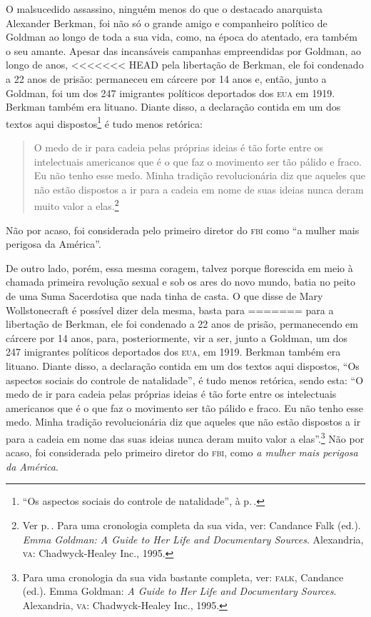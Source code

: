 O malsucedido assassino,
ninguém menos do que o destacado anarquista Alexander Berkman, foi não
só o grande amigo e companheiro político de Goldman ao longo de toda a
sua vida, como, na época do atentado, era também o seu amante. Apesar
das incansáveis campanhas empreendidas por Goldman, ao longo de anos,
<<<<<<< HEAD
pela libertação de Berkman, ele foi condenado a 22 anos de
prisão: permaneceu em cárcere por 14 anos e, então,
junto a Goldman, foi um dos 247 imigrantes políticos deportados
dos \textsc{eua} em 1919. Berkman também era lituano. Diante disso, a declaração
contida em um dos textos aqui dispostos\footnote{``Os aspectos sociais do
controle de natalidade'', à p.\,\pageref{ref4}.} é tudo menos retórica:

\begin{quote}
O medo de ir para
cadeia pelas próprias ideias é tão forte entre os intelectuais
americanos que é o que faz o movimento ser tão pálido e fraco. Eu não
tenho esse medo. Minha tradição revolucionária diz que aqueles que não
estão dispostos a ir para a cadeia em nome de suas ideias nunca deram
muito valor a elas.\footnote{Ver p.\,\pageref{ref5}. Para uma cronologia completa da sua vida, ver: Candance Falk (ed.). \emph{Emma Goldman: A Guide to
  Her Life and Documentary Sources}. Alexandria, \textsc{va}: Chadwyck-Healey
  Inc., 1995.}
\end{quote}

  Não por acaso, foi considerada pelo primeiro diretor do
\textsc{fbi} como ``a mulher mais perigosa da América''.

De outro lado, porém, essa mesma coragem, talvez porque florescida em
meio à chamada primeira revolução sexual e sob os ares do novo mundo,
batia no peito de uma Suma Sacerdotisa que nada tinha de casta. O que
disse de Mary Wollstonecraft é possível dizer dela mesma, basta para
=======
para a libertação de Berkman, ele foi condenado a 22 anos de
prisão, permanecendo em cárcere por 14 anos, para, posteriormente,
vir a ser, junto a Goldman, um dos 247 imigrantes políticos deportados
dos \textsc{eua}, em 1919. Berkman também era lituano. Diante disso, a declaração
contida em um dos textos aqui dispostos, ``Os aspectos sociais do
controle de natalidade'', é tudo menos retórica, sendo esta: ``O medo de
ir para cadeia pelas próprias ideias é tão forte entre os intelectuais
americanos que é o que faz o movimento ser tão pálido e fraco. Eu não
tenho esse medo. Minha tradição revolucionária diz que aqueles que não
estão dispostos a ir para a cadeia em nome das suas ideias nunca deram
muito valor a elas''.\footnote{Para uma cronologia da sua vida bastante
  completa, ver: \textsc{falk}, Candance (ed.). Emma Goldman: \textit{A Guide to
  Her Life and Documentary Sources}. Alexandria, \textsc{va}: Chadwyck-Healey
  Inc., 1995.} Não por acaso, foi considerada pelo primeiro diretor do
\textsc{fbi}, como \textit{a mulher mais perigosa da América}.

